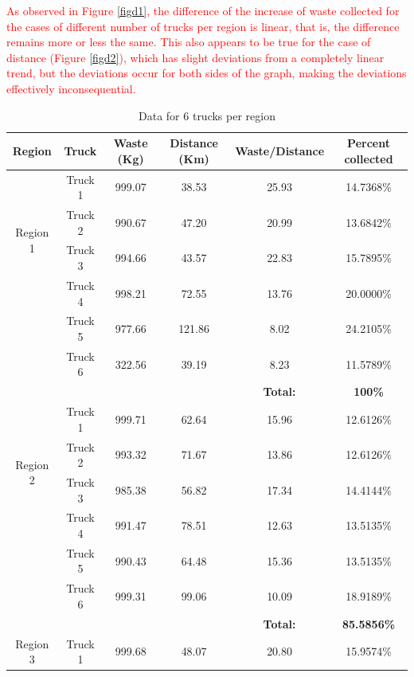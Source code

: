 \documentclass[12pt]{article}
\begin{document}
\textcolor{red}{As observed in Figure \ref{figd1}, the difference of the increase of waste collected for the cases of different number of trucks per region is linear, that is, the difference remains more or less the same. This also appears to be true for the case of distance (Figure \ref{figd2}), which has slight deviations from a completely linear trend, but the deviations occur for both sides of the graph, making the deviations effectively inconsequential.}
\begin{table}[H]
    \centering
    \caption{ Data for 6 trucks per region} \label{tab2}
    \vspace*{0.3cm}
    \begin{tabular}{|c|c|c|c|c|c|}
        \hline Region & Truck & Waste (Kg) & Distance (Km) & Waste/Distance & Percent collected \\
        \hline \multirow{4}{*}{Region 1} & Truck 1 & 999.07& 38.53 & 25.93 &14.7368\% \\
        \cline{2-6}& Truck 2 & 990.67 & 47.20 & 20.99 & 13.6842\%\\        
        \cline{2-6}& Truck 3 & 994.66 & 43.57 & 22.83 & 15.7895\%\\        
        \cline{2-6}& Truck 4 & 998.21 & 72.55 & 13.76 & 20.0000\%\\      
        \cline{2-6}& Truck 5 & 977.66 & 121.86 & 8.02 & 24.2105\%\\      
        \cline{2-6}& Truck 6 & 322.56 & 39.19 & 8.23 & 11.5789\%\\
        \hline & & & &\textbf{Total:} &\textbf{100\%}\\
        \hline \multirow{4}{*}{Region 2} & Truck 1 & 999.71 & 62.64 & 15.96 & 12.6126\% \\
        \cline{2-6}& Truck 2 & 993.32 & 71.67 & 13.86 & 12.6126\%\\        
        \cline{2-6}& Truck 3 & 985.38 & 56.82 & 17.34 & 14.4144\%\\        
        \cline{2-6}& Truck 4 & 991.47 & 78.51 & 12.63 & 13.5135\%\\        
        \cline{2-6}& Truck 5 & 990.43 & 64.48 & 15.36 & 13.5135\%\\        
        \cline{2-6}& Truck 6 & 999.31 & 99.06 & 10.09 & 18.9189\%\\
        \hline & & & &\textbf{Total:} &\textbf{85.5856\%}\\     
        \hline \multirow{4}{*}{Region 3} & Truck 1 & 999.68 & 48.07 & 20.80 & 15.9574\% \\

\end{tabular}
\end{table}
\end{document}
